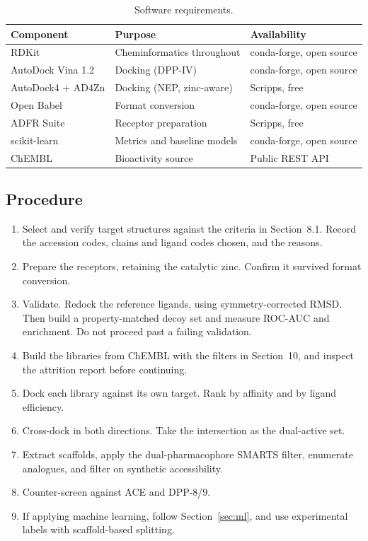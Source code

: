 \documentclass[11pt,a4paper]{article}
\begin{document}
\begin{table}[htbp]
\centering
\small
\caption{Software requirements.}
\begin{tabular}{lll}
\toprule
\textbf{Component} & \textbf{Purpose} & \textbf{Availability} \\
\midrule
RDKit & Cheminformatics throughout & conda-forge, open source \\
AutoDock Vina 1.2 & Docking (DPP-IV) & conda-forge, open source \\
AutoDock4 + AD4Zn & Docking (NEP, zinc-aware) & Scripps, free \\
Open Babel & Format conversion & conda-forge, open source \\
ADFR Suite & Receptor preparation & Scripps, free \\
scikit-learn & Metrics and baseline models & conda-forge, open source \\
ChEMBL & Bioactivity source & Public REST API \\
\bottomrule
\end{tabular}
\end{table}

\subsection{Procedure}

\begin{enumerate}
\item Select and verify target structures against the criteria in Section~8.1.
Record the accession codes, chains and ligand codes chosen, and the reasons.

\item Prepare the receptors, retaining the catalytic zinc. Confirm it survived
format conversion.

\item Validate. Redock the reference ligands, using symmetry-corrected RMSD.
Then build a property-matched decoy set and measure ROC-AUC and enrichment. Do
not proceed past a failing validation.

\item Build the libraries from ChEMBL with the filters in Section~10, and
inspect the attrition report before continuing.

\item Dock each library against its own target. Rank by affinity and by ligand
efficiency.

\item Cross-dock in both directions. Take the intersection as the dual-active
set.

\item Extract scaffolds, apply the dual-pharmacophore SMARTS filter, enumerate
analogues, and filter on synthetic accessibility.

\item Counter-screen against ACE and DPP-8/9.

\item If applying machine learning, follow Section~\ref{sec:ml}, and use
experimental labels with scaffold-based splitting.
\end{enumerate}
\end{document}
